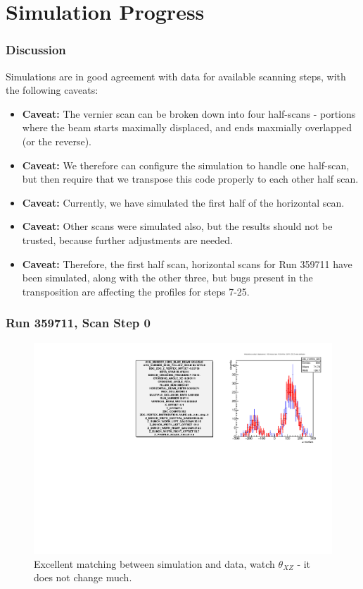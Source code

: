 \section{Simulation Progress}

\begin{frame}
\frametitle{Discussion}
Simulations are in good agreement with data for available scanning steps, with
the following caveats:
\begin{itemize}
	\item \textbf{Caveat:} The vernier scan can be broken down into four
		half-scans - portions where the beam starts maximally displaced, and ends
		maxmially overlapped (or the reverse).
	\item \textbf{Caveat:} We therefore can configure the simulation to handle
		one half-scan, but then require that we transpose this code properly to
		each other half scan.
\item \textbf{Caveat:} Currently, we have simulated the first half of the
	horizontal scan.
\item \textbf{Caveat:} Other scans were simulated also, but the results should
	not be trusted, because further adjustments are needed.
\item \textbf{Caveat:} Therefore, the first half scan, horizontal scans for Run
	359711 have been simulated, along with the other three, but bugs present in
	the transposition are affecting the profiles for steps 7-25.
\end{itemize}

\end{frame}


\begin{frame}
\frametitle{Run 359711, Scan Step 0}
\begin{figure}
\begin{center}
\includegraphics[width=\linewidth]{"figs/359711_step_0_zdc_zvertex"}
\caption{Excellent matching between simulation and data, watch $\theta_{XZ}$ - it does not change much.}
\label{fig:359711_step_0_zdc_zvertex}
\end{center}
\end{figure}
\end{frame}

